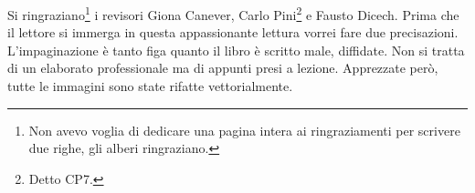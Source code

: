 
Si ringraziano\footnote{Non avevo voglia di dedicare una pagina intera ai ringraziamenti per scrivere due righe, gli alberi ringraziano.} i revisori Giona Canever, Carlo Pini\footnote{Detto CP7.} e Fausto Dicech. Prima che il lettore si immerga in questa appassionante lettura vorrei fare due precisazioni. L'impaginazione è tanto figa quanto il libro è scritto male, diffidate. Non si tratta di un elaborato professionale ma di appunti presi a lezione. Apprezzate però, tutte le immagini sono state rifatte vettorialmente.



